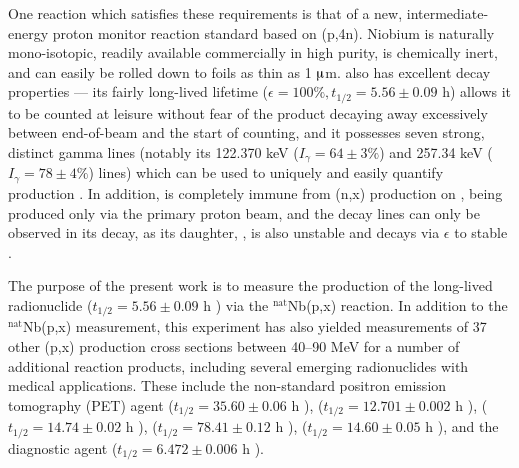 \documentclass[3p]{elsarticle}
\newcommand{\comment}[1]{\todo[color=blue!20!white,inline]{ASV: #1}}
\begin{document}
One  reaction which satisfies these requirements is that of a new, intermediate-energy proton monitor reaction standard based on (p,4n). 
Niobium is naturally mono-isotopic, readily  available commercially in high purity, is chemically inert, and can easily be rolled down to foils as thin as 1 $\micro$m.  
 also has excellent decay properties --- its fairly long-lived lifetime ($\epsilon=100\%, t_{1/2}=5.56 \pm 0.09$ h) allows it to be counted at leisure without fear of the product  decaying away excessively between end-of-beam and the start of counting, and it possesses seven strong, distinct gamma lines (notably its 122.370 keV ($I_\gamma = 64 \pm 3\%$) and 257.34 keV ($I_\gamma = 78 \pm 4\%$) lines) which can be used to uniquely and easily   quantify  production \cite{Browne1997}. 
In addition,   is completely immune from (n,x) production on  , being produced only via the primary proton beam, and the  decay lines can only be observed in its decay, as its daughter, , is also unstable and decays via $\epsilon$ to stable . 
 
The purpose of the present work is to  measure the production of the long-lived radionuclide  ($t_{1/2}=5.56 \pm 0.09$ h \cite{Browne1997}) via the $^\text{nat}$Nb(p,x) reaction. 
In addition to the $^\text{nat}$Nb(p,x) measurement, this experiment has also yielded measurements of 37 other (p,x) production cross sections between 40--90 MeV  for a number of additional reaction products, including several emerging radionuclides with medical applications.
These include the non-standard positron emission tomography (PET) agent   ($t_{1/2}=35.60\pm0.06$ h \cite{Bhat1998}),  ($t_{1/2}=12.701 \pm 0.002$ h \cite{Singh2007}),   ($t_{1/2}=14.74\pm0.02$ h \cite{NEGRET20151}),  ($t_{1/2}=78.41\pm0.12$ h \cite{Singh2013}),   ($t_{1/2}=14.60 \pm 0.05$ h \cite{Browne1997}),  and the diagnostic agent  ($t_{1/2}=6.472\pm0.006$ h \cite{Tuli2003}). 


%   
\end{document}
